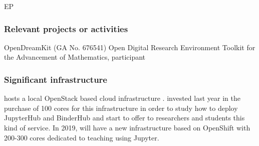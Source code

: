 \begin{sitedescription}{EP}
\subsubsection*{Relevant projects or activities}

\begin{compactenum}
\item OpenDreamKit (GA No. 676541) Open Digital Research Environment
Toolkit for the Advancement of Mathematics, participant
\end{compactenum}

\subsubsection*{Significant infrastructure}

 hosts a local OpenStack based cloud infrastructure
.  invested last year in the purchase of 100 cores for this infrastructure in order to study how to deploy JupyterHub and BinderHub and start to offer to researchers and students this kind of service.
In 2019,  will have a new infrastructure based on OpenShift with 200-300 cores dedicated to teaching using Jupyter.

\end{sitedescription}

